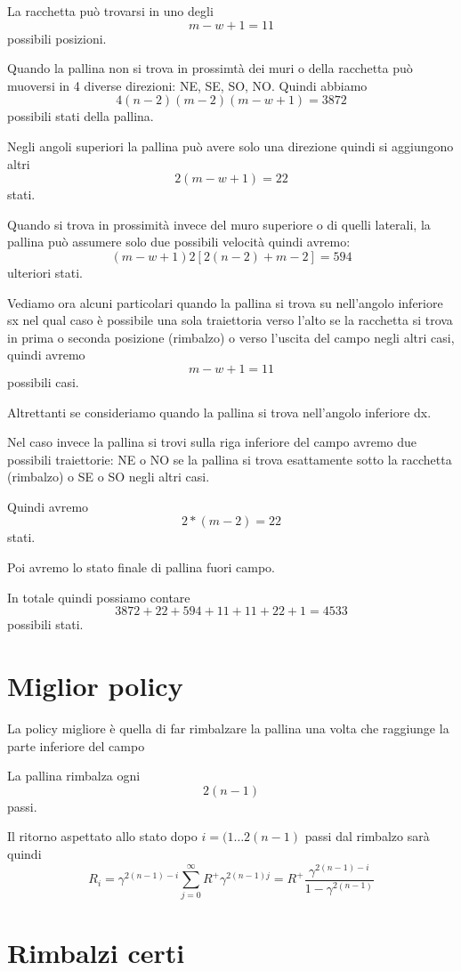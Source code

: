\documentclass[a4paper,11pt]{article}
\begin{document}
La racchetta può trovarsi in uno degli
\[m - w + 1 = 11 \] possibili posizioni.

Quando la pallina non si trova in prossimtà dei muri o della racchetta
può muoversi in 4 diverse direzioni: NE, SE, SO, NO.
Quindi abbiamo
\[ 4 (n-2)(m-2) (m - w + 1) = 3872 \]
possibili stati della pallina.

Negli angoli superiori la pallina può avere solo una direzione quindi
si aggiungono altri 
\[
	2 (m -w +1) = 22
\] stati.

Quando si trova in prossimità invece del muro superiore o di quelli laterali, la pallina può assumere solo due possibili velocità quindi avremo:
\[ (m -w + 1) 2 [ 2 (n - 2) + m - 2] = 594 \]
ulteriori stati.

Vediamo ora alcuni particolari quando la pallina si trova su nell'angolo
inferiore sx nel qual caso è possibile una sola traiettoria verso l'alto
se la racchetta si trova in prima o seconda posizione (rimbalzo) o verso 
l'uscita del campo negli altri casi, quindi avremo
\[ m-w+1 = 11 \] possibili casi.

Altrettanti se consideriamo quando la pallina si trova nell'angolo inferiore dx.

Nel caso invece la pallina si trovi sulla riga inferiore del campo avremo due possibili traiettorie: NE o  NO se la pallina si trova esattamente sotto la racchetta (rimbalzo) o SE o SO negli altri casi.

Quindi avremo
\[ 2 * (m - 2) = 22 \] stati.

Poi avremo lo stato finale di pallina fuori campo.

In totale quindi possiamo contare
\[
	3872 + 22 + 594 + 11 + 11 + 22 + 1 = 4533
\] possibili stati.


\section{Miglior policy}

La policy migliore è quella di far rimbalzare la pallina una volta che raggiunge la parte inferiore del campo

La pallina rimbalza ogni
\[
	2 (n - 1)
\]
passi.

Il ritorno aspettato allo stato dopo $ i = (1 \dots 2(n-1) $ passi dal rimbalzo sarà quindi
\[
	R_i = \gamma ^ {2(n-1)-i} \sum_{j=0}^{\infty} R^+ \gamma ^ {2(n-1)j} =
	 R^+ \frac{ \gamma ^ {2(n-1)-i}}{1-\gamma ^ {2(n-1)}}
\]


\section{Rimbalzi certi}
\end{document}
